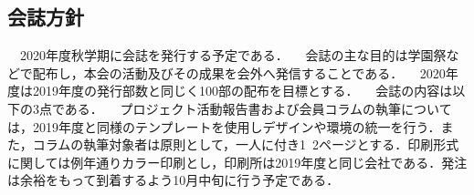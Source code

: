 \subsection*{会誌方針}

　2020年度秋学期に会誌を発行する予定である．
　会誌の主な目的は学園祭などで配布し，本会の活動及びその成果を会外へ発信することである．
　2020年度は2019年度の発行部数と同じく100部の配布を目標とする．
　会誌の内容は以下の3点である．
　プロジェクト活動報告書および会員コラムの執筆については，2019年度と同様のテンプレートを使用しデザインや環境の統一を行う．また，コラムの執筆対象者は原則として，一人に付き1~2ページとする．印刷形式に関しては例年通りカラー印刷とし，印刷所は2019年度と同じ会社である．発注は余裕をもって到着するよう10月中旬に行う予定である．

